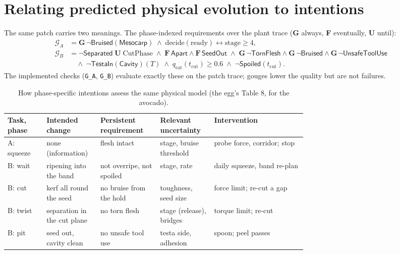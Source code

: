 \documentclass[10.5pt,a4paper]{article}
\begin{document}
\section{Relating predicted physical evolution to intentions}
The same patch carries two meanings. The phase-indexed requirements over the plant trace (\textbf{G} always,
\textbf{F} eventually, \textbf{U} until):
\begin{align}
\mathcal{G}_A &= \mathbf{G}\,\neg\mathsf{Bruised}(\mathsf{Mesocarp})\;\wedge\;\text{decide}(\text{ready})
 \leftrightarrow \text{stage}\ge 4,\\
\mathcal{G}_B &= \neg\mathsf{Separated}\;\mathbf{U}\;\text{CutPhase}\;\wedge\;\mathbf{F}\,\mathsf{Apart}
 \wedge \mathbf{F}\,\mathsf{SeedOut}\;\wedge\;\mathbf{G}\,\neg\mathsf{TornFlesh}\wedge\mathbf{G}\,\neg\mathsf{Bruised}
 \wedge\mathbf{G}\,\neg\mathsf{UnsafeToolUse}\nonumber\\
 &\quad\wedge\;\neg\mathsf{TestaIn}(\mathsf{Cavity})(T)\;\wedge\;q_\text{eat}(t_\text{cut})\ge 0.6\;\wedge\;
 \neg\mathsf{Spoiled}(t_\text{cut}).
\end{align}
The implemented checks (\texttt{G\_A}, \texttt{G\_B}) evaluate exactly these on the patch trace; gouges lower the
quality but are not failures.
\begin{table}[htbp]\centering\scriptsize\caption{How phase-specific intentions assess the same physical model (the egg's Table 8, for the avocado).}
\begin{tabularx}{\linewidth}{@{}p{0.13\linewidth}p{0.18\linewidth}p{0.2\linewidth}p{0.18\linewidth}X@{}}\toprule Task, phase & Intended change & Persistent requirement & Relevant uncertainty & Intervention \\\midrule
A: squeeze & none (information) & flesh intact & stage, bruise threshold & probe force, corridor; stop \\
B: wait & ripening into the band & not overripe, not spoiled & stage, rate & daily squeeze, band re-plan \\
B: cut & kerf all round the seed & no bruise from the hold & toughness, seed size & force limit; re-cut a gap \\
B: twist & separation in the cut plane & no torn flesh & stage (release), bridges & torque limit; re-cut \\
B: pit & seed out, cavity clean & no unsafe tool use & testa side, adhesion & spoon; peel passes \\\bottomrule\end{tabularx}\end{table}
\end{document}
